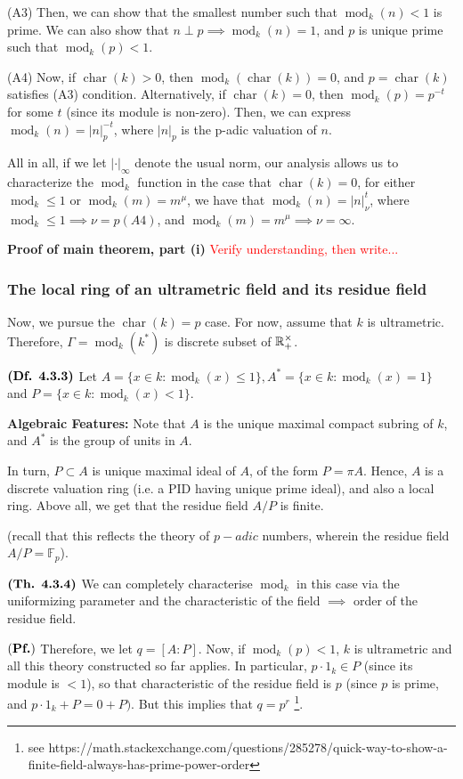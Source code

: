 \documentclass{article}
\DeclareMathOperator{\modl}{mod}
\DeclareMathOperator{\chars}{char}
\begin{document}
(A3) Then, we can show that the smallest number such that $\modl_k(n) < 1$ is prime. We can also show that $n \perp p \implies \modl_k(n) = 1$, and $p$ is unique prime such that $\modl_k(p) < 1$.

(A4) Now, if $\chars(k) > 0$, then $\modl_k(\chars(k)) = 0$, and $p = \chars(k)$ satisfies (A3) condition. 
Alternatively, if $\chars(k) = 0$, then $\modl_k(p) = p^{-t}$ for some $t$ (since its module is non-zero). Then, we can express $\modl_k(n) = |n|_{p}^{-t}$, where $|n|_p$ is the p-adic valuation of $n$.

All in all, if we let $|\cdot|_{\infty}$ denote the usual norm, our analysis allows us to characterize the $\modl_k$ function in the case that $\chars(k) = 0$, for either $\modl_k \leq 1$ or $\modl_k(m) = m^{\mu}$, we have that $\modl_k(n) = |n|_{\nu}^t$, where $\modl_k \leq 1 \implies \nu = p (A4)$, and $\modl_k(m) = m^{\mu} \implies \nu = \infty$.

\textbf{Proof of main theorem, part (i)}
\textcolor{red}{Verify understanding, then write...}

\subsubsection{The local ring of an ultrametric field and its residue field}

Now, we pursue the $\chars(k) = p$ case. For now, assume that $k$ is ultrametric. Therefore, $\Gamma = \modl_k(k^*)$ is discrete subset of $\mathbb{R}_+^{\times}$. 

$\textbf{(Df. 4.3.3)}$ Let $A = \{ x \in k: \modl_k(x) \leq 1\}, A^* = \{ x \in k: \modl_k(x) = 1\} $ and $P= \{ x \in k: \modl_k(x) < 1\}$. 

\textbf{Algebraic Features:} Note that $A$ is the unique maximal compact subring of $k$, and $A^*$ is the group of units in $A$. 

In turn, $P \subset A$ is unique maximal ideal of $A$, of the form $P=\pi A$. Hence, $A$ is a discrete valuation ring (i.e. a PID having unique prime ideal), and also a local ring. Above all, we get that the residue field $A/P$ is finite.

(recall that this reflects the theory of $p-adic$ numbers, wherein the residue field $A/P = \mathbb{F}_p$).

$\textbf{(Th. 4.3.4)}$ We can completely characterise $\modl_k$ in this case via the uniformizing parameter and the characteristic of the field $\implies$ order of the residue field.

$(\textbf{Pf.})$
Therefore, we let $q = [A:P]$. Now, if $\modl_k(p) < 1$, $k$ is ultrametric and all this theory constructed so far applies. In particular, $p \cdot 1_k \in P$ (since its module is $< 1$), so that characteristic of the residue field is $p$ (since $p$ is prime, and $p \cdot 1_k + P = 0 + P)$. But this implies that $q = p^r$ \footnote{see https://math.stackexchange.com/questions/285278/quick-way-to-show-a-finite-field-always-has-prime-power-order}.
\end{document}
